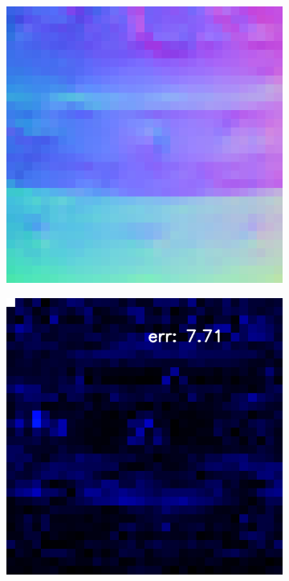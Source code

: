 \begin{figure}
\begin{subfigure}[b]{0.24\linewidth}
	\end{subfigure}
	\begin{subfigure}[b]{0.24\linewidth}
		\includegraphics[width=\linewidth]{./Figures/gcnn_synthetic/eval_2_normal_GCNN-GCNN.png}
	\end{subfigure}
	\begin{subfigure}[b]{0.24\linewidth}
		\includegraphics[width=\linewidth]{./Figures/gcnn_synthetic/eval_2_error_GCNN-GCNN.png}
	\end{subfigure}
	

\end{figure}
